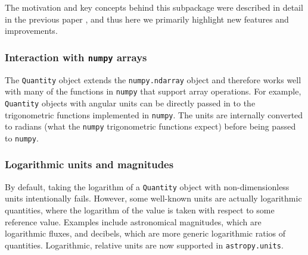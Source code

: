 \documentclass[modern]{aastex61}
\newcommand{\package}[1]{\texttt{#1}\xspace}
\newcommand{\astropypkg}{\package{astropy}}
\newcommand{\inlinecomment}[2]{\todo[inline]{#1: #2}\xspace}
\begin{document}
The motivation and key concepts behind this subpackage were described in detail
in the previous paper \citep{astropy}, and thus here we primarily highlight new
features and improvements.

\subsubsection{Interaction with \package{numpy} arrays}

The \texttt{Quantity} object extends
the \texttt{numpy.ndarray} object and therefore
works well with many of the functions in \texttt{numpy} that support
array operations. For example, \texttt{Quantity} objects with angular
units can be directly passed in to the trigonometric functions implemented in
\texttt{numpy}. The units are internally converted to radians (what the \texttt{numpy}
trigonometric functions expect) before being passed to \texttt{numpy}.




\subsubsection{Logarithmic units and magnitudes}
        By default, taking the logarithm of
        a \texttt{Quantity} object with non-dimensionless units intentionally
        fails.
        However, some well-known units are actually logarithmic quantities,
        where the logarithm of the value is taken with respect to some reference
        value.
        Examples include astronomical magnitudes, which are logarithmic fluxes,
        and decibels, which are more generic logarithmic ratios of quantities.
        Logarithmic, relative units are now supported in \texttt{astropy.units}.
\end{document}
